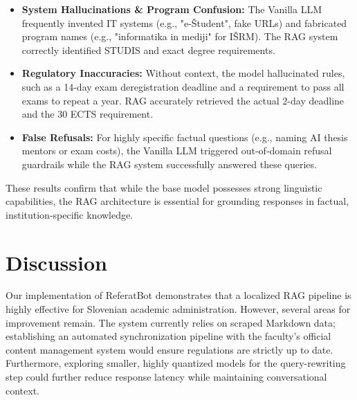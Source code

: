 \documentclass[fleqn,moreauthors,10pt]{ds_report}
\begin{document}
\begin{itemize}
    \item \textbf{System Hallucinations \& Program Confusion:} The Vanilla LLM frequently invented IT systems (e.g., "e-Študent", fake URLs) and fabricated program names (e.g., "informatika in mediji" for IŠRM). The RAG system correctly identified STUDIS and exact degree requirements.
    \item \textbf{Regulatory Inaccuracies:} Without context, the model hallucinated rules, such as a 14-day exam deregistration deadline and a requirement to pass all exams to repeat a year. RAG accurately retrieved the actual 2-day deadline and the 30 ECTS requirement.
    \item \textbf{False Refusals:} For highly specific factual questions (e.g., naming AI thesis mentors or exam costs), the Vanilla LLM triggered out-of-domain refusal guardrails while the RAG system successfully answered these queries.
\end{itemize}

These results confirm that while the base model possesses strong linguistic capabilities, the RAG architecture is essential for grounding responses in factual, institution-specific knowledge.

\section*{Discussion}
Our implementation of ReferatBot demonstrates that a localized RAG pipeline is highly effective for Slovenian academic administration.
However, several areas for improvement remain. The system currently relies on scraped Markdown data; establishing an automated synchronization pipeline with the faculty's official content management system would ensure regulations are strictly up to date. Furthermore, exploring smaller, highly quantized models for the query-rewriting step could further reduce response latency while maintaining conversational context.




\clearpage

\appendix
\end{document}
